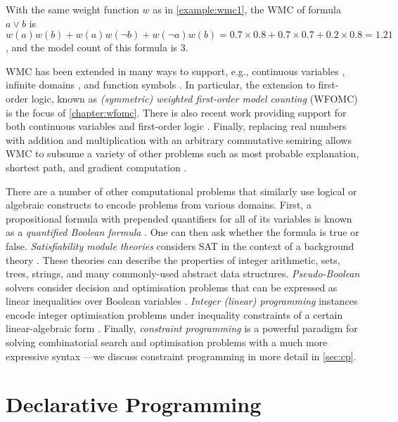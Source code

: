 \begin{example}
  With the same weight function $w$ as in \cref{example:wmc1}, the WMC of
  formula $a \lor b$ is
  $w(a)w(b) + w(a)w(\neg b) + w(\neg a)w(b) = 0.7 \times 0.8 + 0.7 \times 0.7 + 0.2 \times 0.8 = 1.21$,
  and the model count of this formula is 3.
\end{example}

WMC has been extended in many ways to support, e.g., continuous variables
\citep{DBLP:conf/ijcai/BellePB15}, infinite domains
\citep{DBLP:conf/aaai/Belle17}, and function symbols
\citep{DBLP:conf/uai/Belle17}. In particular, the extension to first-order
logic, known as \emph{(symmetric) weighted first-order model counting} (WFOMC)
\citep{DBLP:journals/cacm/GogateD16,DBLP:conf/ijcai/BroeckTMDR11} is the focus
of \cref{chapter:wfomc}. There is also recent work providing support for both
continuous variables and first-order logic \citep{DBLP:conf/uai/FeldsteinB21}.
Finally, replacing real numbers with addition and multiplication with an
arbitrary commutative semiring allows WMC to subsume a variety of other problems
such as most probable explanation, shortest path, and gradient computation
\citep{DBLP:journals/ijar/BelleR20,DBLP:journals/japll/KimmigBR17}.

There are a number of other computational problems that similarly use logical or
algebraic constructs to encode problems from various domains. First, a
propositional formula with prepended quantifiers for all of its variables is
known as a \emph{quantified Boolean formula} \citep{DBLP:series/faia/BuningB09}.
One can then ask whether the formula is true or false. \emph{Satisfiability
  module theories} considers SAT in the context of a background theory
\citep{DBLP:series/faia/BarrettSST09}. These theories can describe the
properties of integer arithmetic, sets, trees, strings, and many commonly-used
abstract data structures. \emph{Pseudo-Boolean} solvers consider decision and
optimisation problems that can be expressed as linear inequalities over Boolean
variables \citep{DBLP:series/faia/RousselM09}. \emph{Integer (linear)
  programming} instances encode integer optimisation problems under inequality
constraints of a certain linear-algebraic form \citep{wolsey2020integer}.
Finally, \emph{constraint programming} is a powerful paradigm for solving
combinatorial search and optimisation problems with a much more expressive
syntax \citep{DBLP:reference/fai/2}---we discuss constraint programming in more
detail in \cref{sec:cp}.

\section{Declarative Programming}\label{sec:declarative}

